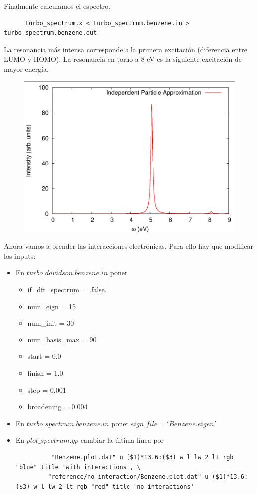   Finalmente calculamos el espectro.
    \begin{verbatim}
      turbo_spectrum.x < turbo_spectrum.benzene.in > turbo_spectrum.benzene.out
    \end{verbatim}

  La resonancia más intensa corresponde a la primera excitación (diferencia entre LUMO y HOMO). La resonancia en torno a 8 eV es la siguiente excitación de mayor energía.
    \begin{figure}[H]
        \centering
        \includegraphics[scale = 0.6]{figs/D6/Benceno_IPA.png}
    \end{figure}

  Ahora vamos a prender las interacciones electrónicas. Para ello hay que modificar los inputs:
    \begin{itemize}
      \item En $turbo\_davidson.benzene.in$ poner
        \begin{itemize}
          \item if\_dft\_spectrum = .false.
          \item num\_eign = 15
          \item num\_init = 30
          \item num\_basis\_max = 90
          \item start = 0.0
          \item finish = 1.0
          \item step = 0.001
          \item broadening = 0.004
        \end{itemize}
      \item En $turbo\_spectrum.benzene.in$ poner $eign\_file = 'Benzene.eigen'$
      \item En $plot\_spectrum.gp$ cambiar la última línea por
        \begin{verbatim}
          "Benzene.plot.dat" u ($1)*13.6:($3) w l lw 2 lt rgb "blue" title 'with interactions', \
         "reference/no_interaction/Benzene.plot.dat" u ($1)*13.6:($3) w l lw 2 lt rgb "red" title 'no interactions'
        \end{verbatim}
    \end{itemize}

